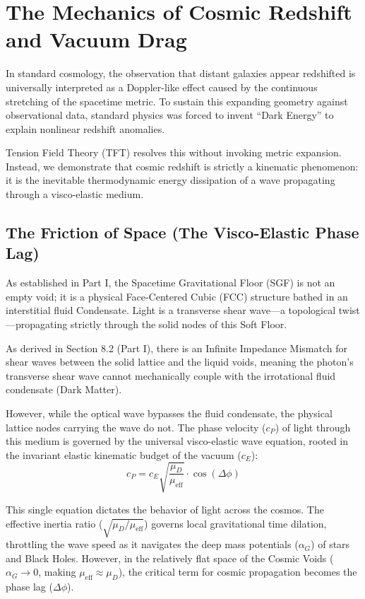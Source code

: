 \chapter{The Mechanics of Cosmic Redshift and Vacuum Drag}
\label{chap:cosmic_redshift}

In standard cosmology, the observation that distant galaxies appear redshifted is universally interpreted as a Doppler-like effect caused by the continuous stretching of the spacetime metric. To sustain this expanding geometry against observational data, standard physics was forced to invent ``Dark Energy'' to explain nonlinear redshift anomalies.

Tension Field Theory (TFT) resolves this without invoking metric expansion. Instead, we demonstrate that cosmic redshift is strictly a kinematic phenomenon: it is the inevitable thermodynamic energy dissipation of a wave propagating through a visco-elastic medium.

\section{The Friction of Space (The Visco-Elastic Phase Lag)}
As established in Part I, the Spacetime Gravitational Floor (SGF) is not an empty void; it is a physical Face-Centered Cubic (FCC) structure bathed in an interstitial fluid Condensate. Light is a transverse shear wave---a topological twist---propagating strictly through the solid nodes of this Soft Floor.

As derived in Section 8.2 (Part I), there is an Infinite Impedance Mismatch for shear waves between the solid lattice and the liquid voids, meaning the photon's transverse shear wave cannot mechanically couple with the irrotational fluid condensate (Dark Matter).

However, while the optical wave bypasses the fluid condensate, the physical lattice nodes carrying the wave do not. The phase velocity ($c_P$) of light through this medium is governed by the universal visco-elastic wave equation, rooted in the invariant elastic kinematic budget of the vacuum ($c_E$):
\begin{equation}
    c_P = c_E \sqrt{\frac{\mu_D}{\mu_{\text{eff}}}} \cdot \cos(\Delta\phi)
\end{equation}

This single equation dictates the behavior of light across the cosmos. The effective inertia ratio ($\sqrt{\mu_D/\mu_{\text{eff}}}$) governs local gravitational time dilation, throttling the wave speed as it navigates the deep mass potentials ($\alpha_G$) of stars and Black Holes. However, in the relatively flat space of the Cosmic Voids ($\alpha_G \to 0$, making $\mu_{\text{eff}} \approx \mu_D$), the critical term for cosmic propagation becomes the phase lag ($\Delta\phi$).

